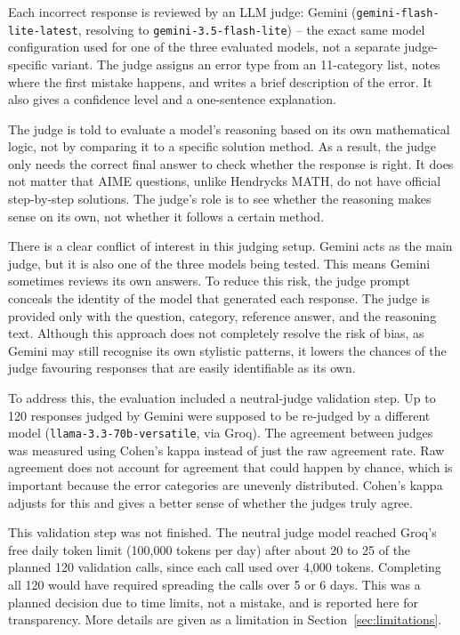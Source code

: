 Each incorrect response is reviewed by an LLM judge: Gemini
(\texttt{gemini-flash-lite-latest}, resolving to
\texttt{gemini-3.5-flash-lite}) -- the exact same model configuration
used for one of the three evaluated models, not a separate judge-specific
variant. The judge assigns an error type from an 11-category list, notes
where the first mistake happens, and writes a brief description of the
error. It also gives a confidence level and a one-sentence explanation.

The judge is told to evaluate a model's reasoning based on its own
mathematical logic, not by comparing it to a specific solution method. As
a result, the judge only needs the correct final answer to check whether
the response is right. It does not matter that AIME questions, unlike
Hendrycks MATH, do not have official step-by-step solutions. The judge's
role is to see whether the reasoning makes sense on its own, not whether
it follows a certain method.

There is a clear conflict of interest in this judging setup. Gemini acts
as the main judge, but it is also one of the three models being tested.
This means Gemini sometimes reviews its own answers. To reduce this
risk, the judge prompt conceals the identity of the model that generated
each response. The judge is provided only with the question, category,
reference answer, and the reasoning text. Although this approach does
not completely resolve the risk of bias, as Gemini may still recognise
its own stylistic patterns, it lowers the chances of the judge favouring
responses that are easily identifiable as its own.

To address this, the evaluation included a neutral-judge validation step.
Up to 120 responses judged by Gemini were supposed to be re-judged by a
different model (\texttt{llama-3.3-70b-versatile}, via Groq). The
agreement between judges was measured using Cohen's kappa instead of just
the raw agreement rate. Raw agreement does not account for agreement that
could happen by chance, which is important because the error categories
are unevenly distributed. Cohen's kappa adjusts for this and gives a
better sense of whether the judges truly agree.

This validation step was not finished. The neutral judge model reached
Groq's free daily token limit (100,000 tokens per day) after about 20 to
25 of the planned 120 validation calls, since each call used over 4,000
tokens. Completing all 120 would have required spreading the calls over 5
or 6 days. This was a planned decision due to time limits, not a mistake,
and is reported here for transparency. More details are given as a
limitation in Section~\ref{sec:limitations}.

